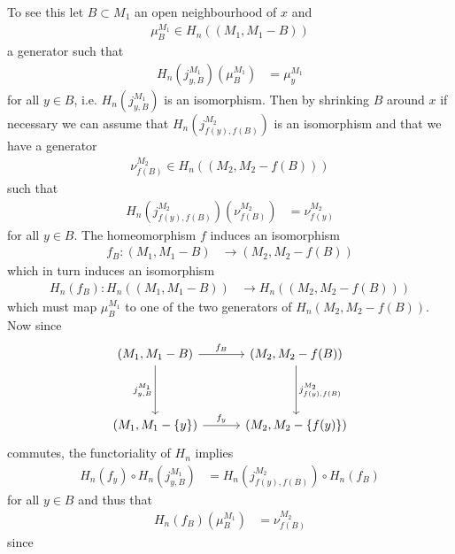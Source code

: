 \begin{prf}
To see this let $B \subset M_{1}$ an open neighbourhood of $x$ and
\begin{align*}
  \mu_{B}^{M_{1}}
  \in
  H_{n}((M_{1},M_{1} - B))
\end{align*}
a generator such that
\begin{align*}
  H_{n}(j_{y,B}^{M_{1}})(\mu_{B}^{M_{1}})
  &=
  \mu_{y}^{M_{1}}
\end{align*}
for all $y \in B$, i.e. $H_{n}(j_{y,B}^{M_{1}})$ is an isomorphism. Then by shrinking $B$ around $x$ if necessary we can assume that $H_{n}(j_{f(y),f(B)}^{M_{2}})$ is an isomorphism and that we have a generator
\begin{align*}
  \nu_{f(B)}^{M_{2}}
  \in
  H_{n}((M_{2},M_{2} - f(B)))
\end{align*}
such that
\begin{align*}
  H_{n}(j_{f(y),f(B)}^{M_{2}})(\nu_{f(B)}^{M_{2}})
  &=
  \nu_{f(y)}^{M_{2}}
\end{align*}
for all $y \in B$. The homeomorphism $f$ induces an isomorphism
\begin{align*}
  f_{B}
  \colon
  (M_{1},M_{1} - B)
  &\to
  (M_{2},M_{2} - f(B))
\end{align*}
which in turn induces an isomorphism
\begin{align*}
  H_{n}(f_{B})
  \colon
  H_{n}((M_{1},M_{1} - B))
  &\to
  H_{n}((M_{2},M_{2} - f(B)))
\end{align*}
which must map $\mu_{B}^{M_{1}}$ to one of the two generators of $H_{n}(M_{2},M_{2} - f(B))$. Now since
\begin{equation*}
\begin{tikzcd}[row sep=4em,column sep=3em]
  (M_{1},M_{1} - B)
  \ar{r}{f_{B}}
  \ar{d}[swap]{j_{y,B}^{M_{1}}}
  &
  (M_{2},M_{2} - f(B))
  \ar{d}{j_{f(y),f(B)}^{M_{2}}}
  \\
  (M_{1},M_{1} - \lbrace y \rbrace)
  \ar{r}{f_{y}}
  &
  (M_{2},M_{2} - \lbrace f(y) \rbrace)
\end{tikzcd}
\end{equation*}
commutes, the functoriality of $H_{n}$ implies
\begin{align*}
  H_{n}(f_{y})
  \circ
  H_{n}(j_{y,B}^{M_{1}})
  &=
  H_{n}(j_{f(y),f(B)}^{M_{2}})
  \circ
  H_{n}(f_{B})
\end{align*}
for all $y \in B$ and thus that
\begin{align*}
  H_{n}(f_{B})(\mu_{B}^{M_{1}})
  &=
  \nu_{f(B)}^{M_{2}}
\end{align*}
since

\end{prf}
